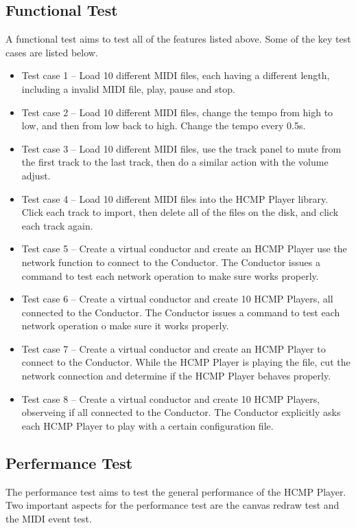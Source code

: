 \subsection{Functional Test}
A functional test aims to test all of the features listed above. Some of the 
key test cases are listed below.
\begin{itemize}
  \item Test case 1 -- Load 10 different MIDI files, each having a different
        length, including a invalid MIDI file, play, pause and stop. 
  \item Test case 2 -- Load 10 different MIDI files, change the tempo from high to 
        low, and then from low back to high. Change the tempo every 0.5s.
  \item Test case 3 -- Load 10 different MIDI files, use the track panel to mute
        from the first track to the last track, then do a similar action with the 
        volume adjust.
  \item Test case 4 -- Load 10 different MIDI files into the HCMP Player library. 
        Click each track to import, then delete all of the files on the disk, and 
        click each track again.  
  \item Test case 5 -- Create a virtual conductor and create an HCMP Player use  
        the network function to connect to the Conductor. The Conductor issues a command
        to test each network operation to make sure works properly. 
  \item Test case 6 -- Create a virtual conductor and create 10 HCMP Players, 
        all connected to the Conductor. The Conductor issues a command to test each network
        operation o make sure it works properly.
  \item Test case 7 -- Create a virtual conductor and create an HCMP Player 
        to connect to the Conductor. While the HCMP Player is playing the 
        file, cut the
        network connection and determine if the HCMP Player behaves properly.
  \item Test case 8 -- Create a virtual conductor and create 10 HCMP Players, observeing
        if all connected to the Conductor. The Conductor explicitly asks each 
        HCMP Player to play with a certain configuration file.
\end{itemize}

\subsection{Perfermance Test}
The performance test aims to test the general performance of the HCMP Player. Two 
important aspects for the performance test are the canvas redraw test and the MIDI
event test. 


